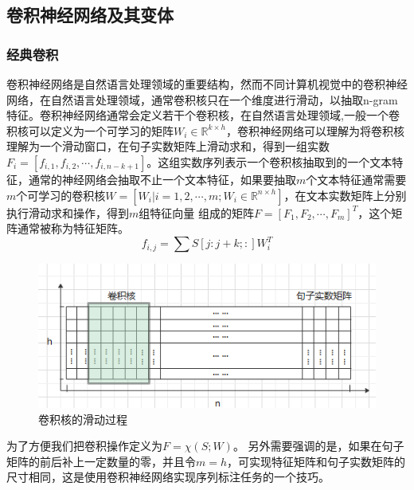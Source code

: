 \documentclass[twoside,a4paper,12pt]{book}%
\begin{document}
\subsection{卷积神经网络及其变体}
\subsubsection{经典卷积}
卷积神经网络是自然语言处理领域的重要结构，然而不同计算机视觉中的卷积神经网络，在自然语言处理领域，通常卷积核只在一个维度进行滑动，以抽取n-gram特征。卷积神经网络通常会定义若干个卷积核，在自然语言处理领域,一般一个卷积核可以定义为一个可学习的矩阵$W_i \in \mathbb{R}^{k \times h}$，卷积神经网络可以理解为将卷积核理解为一个滑动窗口，在句子实数矩阵上滑动求和，得到一组实数$F_i=[f_{i,1},f_{i,2},\cdots,f_{i,n-k+1}]$。这组实数序列表示一个卷积核抽取到的一个文本特征，通常的神经网络会抽取不止一个文本特征，如果要抽取$m$个文本特征通常需要$m$个可学习的卷积核$W=[W_i|i=1,2,\cdots,m;W_i\in \mathbb{R}^{n \times h}]$，在文本实数矩阵上分别执行滑动求和操作，得到$m$组特征向量
组成的矩阵$F=[F_1,F_2,\cdots,F_m]^T$，这个矩阵通常被称为特征矩阵。
$$
f_{i,j}=\sum{S[j:j+k;:]W_i^T}
$$
\begin{figure}[htbp]
\begin{center}
\includegraphics[width=5.0in]{figures/cnn1.png}
\caption{卷积核的滑动过程}
\label{fig:cnn1}
\end{center}
\end{figure}
为了方便我们把卷积操作定义为$F=\mathbb{\chi}(S;W)$。
另外需要强调的是，如果在句子矩阵的前后补上一定数量的零，并且令$m=h$，可实现特征矩阵和句子实数矩阵的尺寸相同，这是使用卷积神经网络实现序列标注任务的一个技巧。
\end{document}
